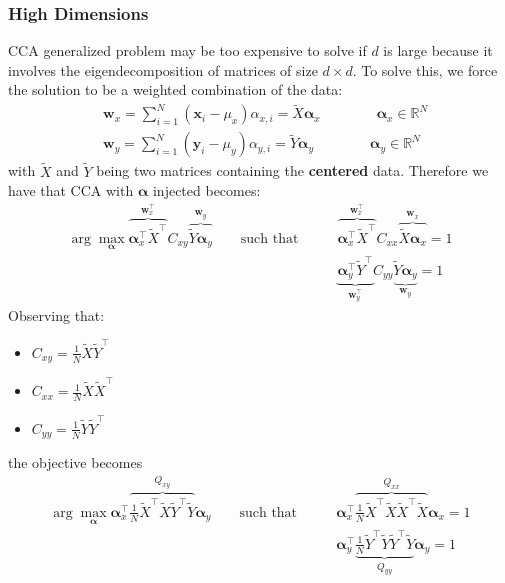 \subsubsection{High Dimensions}
CCA generalized problem may be too expensive to solve if $d$ is large because it involves the eigendecomposition of matrices of size $d \times d$. To solve this, we force the solution to be a weighted combination of the data:
\begin{align*}
	& \mathbf{w}_x = \sum_{i=1}^{N} (\mathbf{x}_i-\mu_x)\alpha_{x,i} = \tilde{X}\mathbf{\alpha}_x \qquad\qquad \mathbf{\alpha}_x \in \mathbb{R}^N\\
	& \mathbf{w}_y = \sum_{i=1}^{N} (\mathbf{y}_i-\mu_y)\alpha_{y,i} = \tilde{Y}\mathbf{\alpha}_y \qquad\qquad \mathbf{\alpha}_y \in \mathbb{R}^N
\end{align*}
with $\tilde{X}$ and $\tilde{Y}$ being two matrices containing the \textbf{centered} data. Therefore we have that CCA with $\mathbf{\alpha}$ injected becomes:
\begin{align*}
	\arg \max_\mathbf{\alpha} \overbrace{\mathbf{\alpha}_x^\top\tilde{X}^\top}^{\mathbf{w}_x^\top}C_{xy}\overbrace{\tilde{Y}\mathbf{\alpha}_y}^{\mathbf{w}_y} \qquad \text{such that} \qquad & \overbrace{\mathbf{\alpha}_x^\top\tilde{X}^\top}^{\mathbf{w}_x^\top}C_{xx}\overbrace{\tilde{X}\mathbf{\alpha}_x}^{\mathbf{w}_x} = 1 \\
	& \underbrace{\mathbf{\alpha}_y^\top\tilde{Y}^\top}_{\mathbf{w}_y^\top}C_{yy}\underbrace{\tilde{Y}\mathbf{\alpha}_y}_{\mathbf{w}_y} = 1
\end{align*}
Observing that:
\begin{itemize}
	\item $C_{xy} = \frac{1}{N}\tilde{X}\tilde{Y}^\top$
	\item $C_{xx} = \frac{1}{N}\tilde{X}\tilde{X}^\top$
	\item $C_{yy} = \frac{1}{N}\tilde{Y}\tilde{Y}^\top$
\end{itemize}
the objective becomes
\begin{align*}
	\arg\max_\mathbf{\alpha} \mathbf{\alpha}_x^\top \overbrace{\frac{1}{N}\tilde{X}^\top\tilde{X}\tilde{Y}^\top\tilde{Y}}^{Q_{xy}}\mathbf{\alpha}_y \qquad \text{such that} \qquad & \mathbf{\alpha}_x^\top \overbrace{\frac{1}{N}\tilde{X}^\top \tilde{X}\tilde{X}^\top\tilde{X}}^{Q_{xx}} \mathbf{\alpha}_x = 1 \\
	& \mathbf{\alpha}_y^\top \underbrace{\frac{1}{N}\tilde{Y}^\top \tilde{Y}\tilde{Y}^\top\tilde{Y}}_{Q_{yy}} \mathbf{\alpha}_y = 1
\end{align*}

